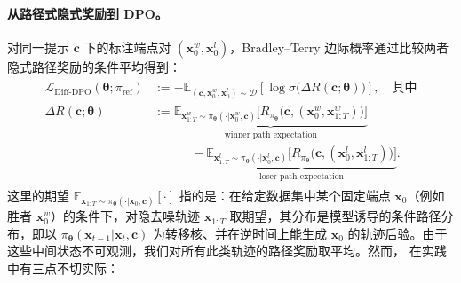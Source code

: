 \paragraph{从路径式隐式奖励到 DPO。}
对同一提示 $\mathbf c$ 下的标注端点对 $(\mathbf x_0^w,\mathbf x_0^l)$，Bradley--Terry 边际概率通过比较两者隐式路径奖励的条件平均得到：
\begin{align}\label{eq:diffusion-dpo}
\begin{aligned}
\mathcal L_{\mathrm{Diff\text{-}DPO}}(\bm\theta;\pi_{\mathrm{ref}})
&:=
- \mathbb E_{(\mathbf c,\mathbf x_0^w,\mathbf x_0^l)\sim\mathcal D}
 \left[\log \sigma \big(\Delta R(\mathbf c;\bm\theta)\big)\right], \quad \text{其中}\\
\Delta R(\mathbf c;\bm\theta)
&:=
\underbrace{\mathbb E_{\mathbf x_{1:T}^w\sim \pi_{\bm\theta}(\cdot | \mathbf x_0^w,\mathbf c)}
 \Big[R_{\pi_{\bm\theta}} \big(\mathbf c,(\mathbf x_0^w,\mathbf x_{1:T}^w)\big)\Big]}_{\text{winner path expectation}}
\\ &\quad\quad\quad-
\underbrace{\mathbb E_{\mathbf x_{1:T}^l\sim \pi_{\bm\theta}(\cdot | \mathbf x_0^l,\mathbf c)}
 \Big[R_{\pi_{\bm\theta}} \big(\mathbf c,(\mathbf x_0^l,\mathbf x_{1:T}^l)\big)\Big]}_{\text{loser path expectation}}.
\end{aligned}
\end{align}
这里的期望 $\mathbb E_{\mathbf x_{1:T}\sim\pi_{\bm\theta}(\cdot|\mathbf x_0,\mathbf c)}[\cdot]$ 指的是：在给定数据集中某个固定端点 $\mathbf x_0$（例如胜者 $\mathbf x_0^w$）的条件下，对隐去噪轨迹 $\mathbf x_{1:T}$ 取期望，其分布是模型诱导的条件路径分布，即以 $\pi_{\bm\theta}(\mathbf x_{t-1}|\mathbf x_t,\mathbf c)$ 为转移核、并在逆时间上能生成 $\mathbf x_0$ 的轨迹后验。由于这些中间状态不可观测，我们对所有此类轨迹的路径奖励取平均。然而， 在实践中有三点不切实际：
